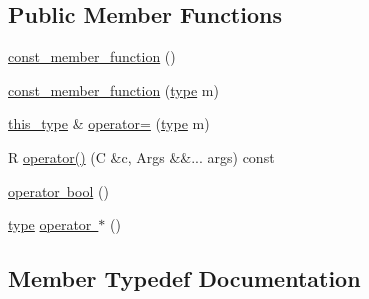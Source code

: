 \subsection*{Public Member Functions}
\begin{DoxyCompactItemize}
\item 
\mbox{\hyperlink{classfakeit_1_1const__member__function_3_01C_00_01R_07Args_8_8_8_08_4_abf82401bcb8638fa04ad20507bd74a9a}{const\+\_\+member\+\_\+function}} ()
\item 
\mbox{\hyperlink{classfakeit_1_1const__member__function_3_01C_00_01R_07Args_8_8_8_08_4_a965b206414d8432385adcf5bf7690ae3}{const\+\_\+member\+\_\+function}} (\mbox{\hyperlink{classfakeit_1_1const__member__function_3_01C_00_01R_07Args_8_8_8_08_4_ab962f803e5a8b5b2078ee8674900288c}{type}} m)
\item 
\mbox{\hyperlink{classfakeit_1_1const__member__function_3_01C_00_01R_07Args_8_8_8_08_4_af7e34265af3f3daedfe6c23d7cd2f36f}{this\+\_\+type}} \& \mbox{\hyperlink{classfakeit_1_1const__member__function_3_01C_00_01R_07Args_8_8_8_08_4_afbe2aca06ddad27395006ac3fbad95e3}{operator=}} (\mbox{\hyperlink{classfakeit_1_1const__member__function_3_01C_00_01R_07Args_8_8_8_08_4_ab962f803e5a8b5b2078ee8674900288c}{type}} m)
\item 
R \mbox{\hyperlink{classfakeit_1_1const__member__function_3_01C_00_01R_07Args_8_8_8_08_4_a196473c6962a3a57b4226b26a18d0be3}{operator()}} (C \&c, Args \&\&... args) const
\item 
\mbox{\hyperlink{classfakeit_1_1const__member__function_3_01C_00_01R_07Args_8_8_8_08_4_ab26036f9b05acc42a37f3f0a31b6c1c2}{operator bool}} ()
\item 
\mbox{\hyperlink{classfakeit_1_1const__member__function_3_01C_00_01R_07Args_8_8_8_08_4_ab962f803e5a8b5b2078ee8674900288c}{type}} \mbox{\hyperlink{classfakeit_1_1const__member__function_3_01C_00_01R_07Args_8_8_8_08_4_a4106166e8bd9b9c529bc6ee3194c5b1b}{operator $\ast$}} ()
\end{DoxyCompactItemize}


\subsection{Member Typedef Documentation}
\mbox{\label{classfakeit_1_1const__member__function_3_01C_00_01R_07Args_8_8_8_08_4_ad143de99770cbbb20eeb588365312860}} 
